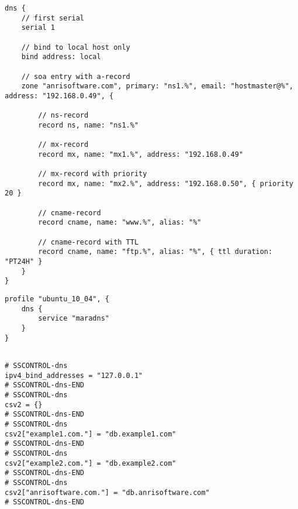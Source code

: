 \begin{lstlisting}[style=Java,label=lst:dns_example_min_script,
title={Dns service minimumal example script using the zone placeholder.}]
dns {
    // first serial
    serial 1
    
    // bind to local host only
    bind address: local
    
    // soa entry with a-record
    zone "anrisoftware.com", primary: "ns1.%", email: "hostmaster@%", address: "192.168.0.49", {
    
        // ns-record
        record ns, name: "ns1.%"
        
        // mx-record
        record mx, name: "mx1.%", address: "192.168.0.49"
        
        // mx-record with priority
        record mx, name: "mx2.%", address: "192.168.0.50", { priority 20 }
        
        // cname-record
        record cname, name: "www.%", alias: "%"
        
        // cname-record with TTL
        record cname, name: "ftp.%", alias: "%", { ttl duration: "PT24H" }
    }
}
\end{lstlisting}

\begin{lstlisting}[style=Java,label=lst:dns_ubuntu_profile_min,
title={Minimal Ubuntu MaraDNS profile, only the DNS service type is needed. The other profile properties are set to default values.}]
profile "ubuntu_10_04", {
    dns {
        service "maradns"
    }
}
\end{lstlisting}

\begin{lstlisting}[style=rcfile_nonumbers,
label=lst:dns_mararc_example,
title={Example MaraDNS configuration file that is created from the DNS profile 
and script. The file is saved as /etc/maradns/mararc}]

# SSCONTROL-dns
ipv4_bind_addresses = "127.0.0.1"
# SSCONTROL-dns-END
# SSCONTROL-dns
csv2 = {}
# SSCONTROL-dns-END
# SSCONTROL-dns
csv2["example1.com."] = "db.example1.com"
# SSCONTROL-dns-END
# SSCONTROL-dns
csv2["example2.com."] = "db.example2.com"
# SSCONTROL-dns-END
# SSCONTROL-dns
csv2["anrisoftware.com."] = "db.anrisoftware.com"
# SSCONTROL-dns-END
\end{lstlisting}

